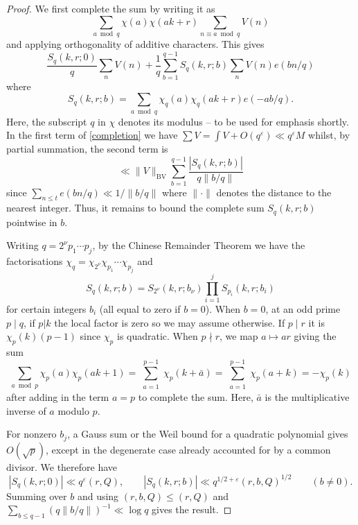 \documentclass[12pt, oneside]{amsart}
\theoremstyle{definition}
\newcommand{\leqs}{\leqslant }
\newcommand{\eps}{\varepsilon}
\newcommand{\1}{\mathds{1}}
\begin{document}
\begin{proof}
We first complete the sum by writing it as 
\[ 
\sum_{a\bmod q}\chi(a)\chi(ak+r)\sum_{n\equiv a\bmod q}V(n)
\]
and applying orthogonality of additive characters. This gives 
\begin{equation}\label{completion}
\frac{S_q(k,r;0)}{q}\sum_n V(n)+\frac{1}{q}\sum_{b=1}^{q-1}S_q(k,r;b)\sum_n V(n)e(bn/q)
\end{equation}
where
\[
 S_q(k,r;b)=\sum_{a\bmod q}
 \chi_q(a)\chi_q(ak+r)e(-ab/q).
\]
Here, the subscript $q$ in $\chi$ denotes its modulus -- to be used for emphasis shortly.
In the first term of \eqref{completion} we have $\sum V=\int V+O(q^\eps)\ll q^\eps M$ whilst, by partial summation, the second term is 
\[
\ll \|V\|_{\mathrm{BV}}\sum_{b=1}^{q-1} \frac{|S_q(k,r;b)|}{q\|b/q\|}
\]
since $\sum_{n\leqs t} e(bn/q)\ll 1/\|b/q\|$ where $\|\cdot\|$ denotes the distance to the nearest integer. Thus, it remains to bound the complete sum $S_q(k,r;b)$ pointwise in $b$. 


Writing $q=2^\nu p_1\cdots p_j$, by the Chinese Remainder Theorem we have the factorisations $\chi_q=\chi_{2^\nu}\chi_{p_1}\cdots \chi_{p_j}$ and 
\[
S_q(k,r;b)=S_{2^\nu}(k,r;b_\nu)\prod_{i=1}^jS_{p_i}(k,r;b_i)
\]
 for certain integers $b_i$ (all equal to zero if $b=0$).
When $b=0$, at an odd prime $p\mid q$, if $p|k$ the local factor is zero so we may assume otherwise. If $p\mid r$ it is $\chi_p(k)(p-1)$
 since $\chi_p$ is quadratic. When $p\nmid r$, we map $a\mapsto ar$ giving the sum 
\[
\sum_{a\bmod p}\chi_p(a)\chi_p(ak+1)=\sum_{\substack{a=1}}^{p-1}\chi_p(k+\bar{a})
=\sum_{\substack{a=1}}^{p-1}\chi_p(a+k)=-\chi_p(k)
\]
after adding in the term $a=p$ to complete the sum. Here, $\bar a$ is the multiplicative inverse of $a$ modulo $p$.  
  
  For nonzero $b_j$, a Gauss
sum or the Weil bound for a quadratic polynomial gives $O(\sqrt p)$, except
in the degenerate case already accounted for by a common divisor.  
We therefore have 
\begin{equation} \label{eq:complete-hybrid}
 |S_q(k,r;0)|\ll q^{\eps}(r,Q),
 \qquad
 |S_q(k,r;b)|\ll q^{1/2+\eps}(r,b,Q)^{1/2}\qquad(b\ne0).
\end{equation}
Summing over $b$ and using $(r,b,Q)\leqs (r,Q)$ and $\sum_{b\leqs q-1}(q\|b/q\|)^{-1}\ll \log q$ gives the result.
\end{proof}
\end{document}
